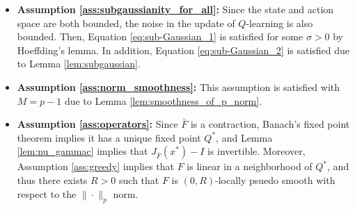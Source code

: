 \documentclass[letterpaper, 10 pt]{article}
\begin{document}
\begin{itemize}
    Next, we have
    \begin{align*}
        [\bar{F}(Q_1)-\bar{F}(Q_2)]_{s,a}  &= \mu^{\pi_b}(s)\pi_b(a\,|\,s) (H(Q_1)-H(Q_2))_{s,a} + (1-\mu^{\pi_b}(s)\pi_b(a\,|\,s))(Q_1(s,a)-Q_{2}(s,a))\\
        &\leq\mu^{\pi_b}(s)\pi_b(a\,|\,s) \|H(Q_1)-H(Q_2)\|_{\infty} + (1-\mu^{\pi_b}(s)\pi_b(a\,|\,s))\|Q_1-Q_{2}\|_\infty\\
        &\leq\mu^{\pi_b}(s)\pi_b(a\,|\,s) \gamma\|Q_1-Q_2\|_{\infty} + (1-\mu^{\pi_b}(s)\pi_b(a\,|\,s))\|Q_1-Q_{2}\|_\infty \\
        &=(1-(1-\gamma)\mu^{\pi_b}(s)\pi_b(a\,|\,s))\|Q_1-Q_{2}\|_\infty\\
        &\leq\left(1-(1-\gamma)\rho_b\right)\|Q_1-Q_{2}\|_\infty,
    \end{align*}
    where in the second inequality we used that the Bellman optimality operator is a $\gamma$-contraction. It follows that
    \begin{align*}
        \|\bar{F}(Q_1)-\bar{F}(Q_2)\|_{\infty} \leq \left(1-(1-\gamma)\rho_b\right)\|Q_1-Q_{2}\|_\infty.
    \end{align*}
    Hence, we can write
    \begin{align*}
        \|\bar{F}(Q_1)-\bar{F}(Q_2)\|_{p} &\leq(|\mathcal{S}||\mathcal{A}|)^{1/p}\|\bar{F}(Q_1)-\bar{F}(Q_2)\|_{\infty}\\
        &\leq (|\mathcal{S}||\mathcal{A}|)^{1/p} \left(1-(1-\gamma)\rho_b\right)\|Q_1-Q_2\|_\infty\\
        &\leq (|\mathcal{S}||\mathcal{A}|)^{1/p} \left(1-(1-\gamma)\rho_b\right)\|Q_1-Q_2\|_p.
    \end{align*}
    Then, for any
    \[ p>p_{\min}:=\frac{\ln\left(|\mathcal{S}||\mathcal{A}|\right)}{\ln\left(\frac{1}{1-(1-\gamma)\rho_b}\right)}\geq 2, \]
    Assumption \ref{ass:contraction} is satisfied with $\gamma_c = (|\mathcal{S}||\mathcal{A}|)^{1/p} \left(1-(1-\gamma)\rho_b\right)$.
    \item \textbf{Assumption \ref{ass:subgaussianity_for_all}:} Since the state and action space are both bounded, the noise in the update of $Q$-learning is also bounded. Then, Equation \eqref{eq:sub-Gaussian_1} is satisfied for some $\sigma>0$ by Hoeffding's lemma. In addition, Equation \eqref{eq:sub-Gaussian_2} is satisfied due to Lemma \ref{lem:subgaussian}. 
    \item \textbf{Assumption \ref{ass:norm_smoothness}:} This assumption is satisfied with $M=p-1$ due to Lemma \ref{lem:smoothness_of_p_norm}.
    \item \textbf{Assumption \ref{ass:operators}:} Since $\bar{F}$ is a contraction, Banach's fixed point theorem implies it has a unique fixed point $Q^*$, and Lemma \ref{lem:nu_gammac} implies that $J_{\bar{F}}(x^*)-I$ is invertible. Moreover, Assumption \ref{ass:greedy} implies that $F$ is linear in a neighborhood of $Q^*$, and thus there exists $R>0$ such that $F$ is $(0,R)$-locally psuedo smooth with respect to the $\|\cdot\|_p$ norm.    

\end{itemize}
\end{document}
